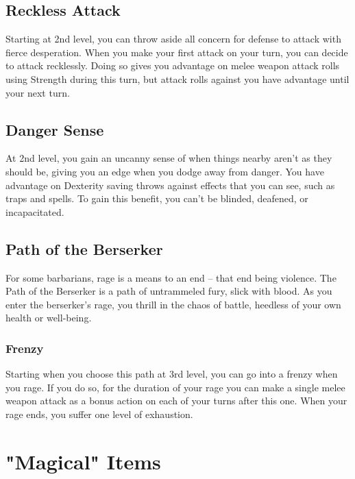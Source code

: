 \documentclass[letterpaper,openany,oneside,twocolumn]{book}
\begin{document}
\subsection*{Reckless Attack}
Starting at 2nd level, you can throw aside all concern for defense to attack with fierce desperation. When you make your first attack on your turn, you can decide to attack recklessly. Doing so gives you advantage on melee weapon attack rolls using Strength during this turn, but attack rolls against you have advantage until your next turn.
\subsection*{Danger Sense}
At 2nd level, you gain an uncanny sense of when things nearby aren't as they should be, giving you an edge when you dodge away from danger. You have advantage on Dexterity saving throws against effects that you can see, such as traps and spells. To gain this benefit, you can't be blinded, deafened, or incapacitated.
\subsection*{Path of the Berserker}
For some barbarians, rage is a means to an end – that end being violence. The Path of the Berserker is a path of untrammeled fury, slick with blood. As you enter the berserker's rage, you thrill in the chaos of battle, heedless of your own health or well-being.
\subsubsection*{Frenzy}
Starting when you choose this path at 3rd level, you can go into a frenzy when you rage. If you do so, for the duration of your rage you can make a single melee weapon attack as a bonus action on each of your turns after this one. When your rage ends, you suffer one level of exhaustion.

\section*{"Magical" Items}
\end{document}
